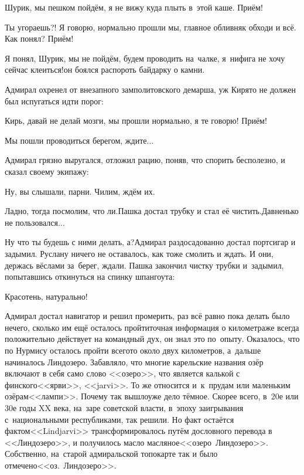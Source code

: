 \diagdash Шурик, мы пешком пойдём, я не вижу куда плыть в~этой каше. Приём!

\diagdash Ты угораешь?! Я говорю, нормально прошли мы, главное обливняк обходи и всё. Как понял? Приём!

\diagdash Я понял, Шурик, мы не пойдём, будем проводить на~чалке, я~нифига не хочу сейчас клеиться!\mdash он боялся распороть байдарку о камни.

Адмирал охренел от внезапного замполитовского демарша, уж Киря\sdash то не должен был испугаться идти порог:

\diagdash Кирь, давай не делай мозги, мы прошли нормально, я те говорю! Приём!

\diagdash Мы пошли проводиться берегом, ждите$\ldots$

Адмирал грязно выругался, отложил рацию, поняв, что спорить бесполезно, и сказал своему экипажу:

\diagdash Ну, вы слышали, парни. Чилим, ждём их.

\diagdash Ладно, тогда посмолим, что ли.\mdash Пашка достал трубку и стал её чистить.\mdash Давненько не пользовался$\ldots$

\diagdash Ну что ты будешь с ними делать, а?\mdash Адмирал раздосадованно достал портсигар и задымил. Руслану ничего не оставалось, как тоже смолить и ждать. И они, держась вёслами за~берег, ждали. Пашка закончил чистку трубки и~задымил, попытавшись откинуться на спинку шпангоута:

\diagdash Красотень, натурально!

Адмирал достал навигатор и решил промерить, раз всё равно пока делать было нечего, сколько им ещё осталось пройти\mdash точная информация о километраже всегда положительно действует на командный дух, он знал это по~опыту. Оказалось, что по Нурмису осталось пройти всего\sdash то около двух километров, а~дальше начиналось Линдозеро. Забавляло, что многие карельские названия озёр включают в себя само слово <<озеро>>, что является калькой с финского\mdash <<ярви>>, <<jarvi>>. То же относится и~к~прудам или маленьким озёрам\mdash <<лампи>>. Почему так вышло\mdash уже дело тёмное. Скорее всего, в~20\sdash е или 30\sdash е годы XX века, на~заре советской власти, в~эпоху заигрывания с~национальными республиками, так решили. Но факт остаётся фактом\mdash <<Lindjarvi>> трансформировалось путём дословного перевода в <<Линдозеро>>, и получилось масло масляное\mdash <<озеро~Линдозеро>>. Собственно, на~старой адмиральской топокарте так и было отмечено\mdash <<оз.~Линдозеро>>. 

